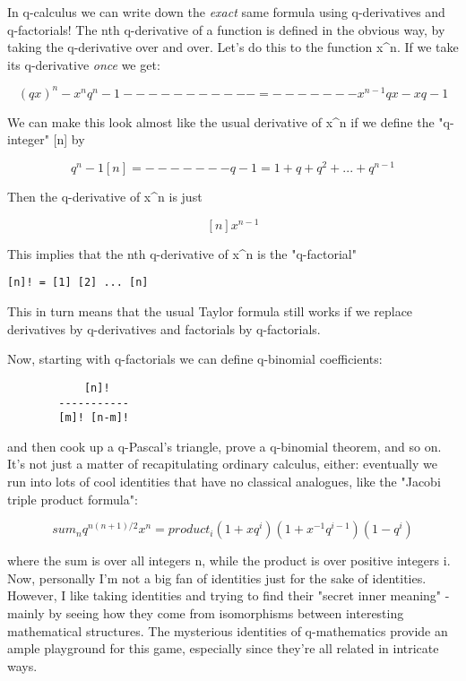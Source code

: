 In q-calculus we can write down the \emph{exact} same formula using
q-derivatives and q-factorials!  The nth q-derivative of a function is
defined in the obvious way, by taking the q-derivative over and over.  
Let's do this to the function x^{n}.  
If we take its q-derivative \emph{once} we get:

$$
     (qx)^{n} - x^{n}         q^{n} - 1
     -----------   =   ------- x^{n-1} 
       qx - x           q - 1
$$
    
We can make this look almost like the usual derivative of x^{n} if
we define the "q-integer" [n] by

$$
            q^{n} - 1
  [n]  =   -------   
            q - 1

       = 1 + q + q^{2} + ... + q^{n-1}
$$
    
Then the q-derivative of x^{n} is just 

$$
[n] x^{n-1}
$$
    
This implies that the nth q-derivative of x^{n} is the "q-factorial"
 
\begin{verbatim}
[n]! = [1] [2] ... [n] 
\end{verbatim}
    
This in turn means that the usual Taylor formula still works if we
replace derivatives by q-derivatives and factorials by q-factorials.

Now, starting with q-factorials we can define q-binomial coefficients:

\begin{verbatim}
            [n]! 
        -----------
        [m]! [n-m]!
\end{verbatim}
    
and then cook up a q-Pascal's triangle, prove a q-binomial theorem, and 
so on.  It's not just a matter of recapitulating ordinary calculus, 
either: eventually we run into lots of cool identities that have no 
classical analogues, like the "Jacobi triple product formula":

$$
                 sum_{n}  q^{n(n+1)/2} x^{n}  =  

        product_{i}  (1 + xq^{i}) (1 + x^{-1}q^{i-1}) (1 - q^{i}) 
$$
    
where the sum is over all integers n, while the product is over positive
integers i.  Now, personally I'm not a big fan of identities just for
the sake of identities.  However, I like taking identities and trying to 
find their "secret inner meaning" - mainly by seeing how they come 
from isomorphisms between interesting mathematical structures.  The 
mysterious identities of q-mathematics provide an ample playground 
for this game, especially since they're all related in intricate ways.  

